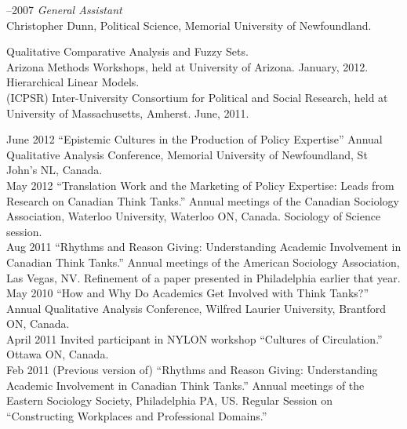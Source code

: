 \documentclass[11pt,usenames,dvipsnames]{article}
\begin{document}
–2007 {\it General Assistant}\\
Christopher Dunn, Political Science, Memorial University of Newfoundland.\\



\noindent Qualitative Comparative Analysis and Fuzzy Sets.\\ 
Arizona Methods Workshops, held at University of Arizona. January, 2012.\\

\noindent Hierarchical Linear Models.\\ 
(ICPSR) Inter-University Consortium for Political and Social Research, held at University of Massachusetts, Amherst. June, 2011.\\



\ind June 2012 ``Epistemic Cultures in the Production of Policy Expertise'' Annual Qualitative Analysis Conference, Memorial University of Newfoundland, St John's NL, Canada.\\

\ind May 2012 ``Translation Work and the Marketing of Policy Expertise: Leads from Research on Canadian Think Tanks.'' Annual meetings of the Canadian Sociology Association, Waterloo University, Waterloo ON, Canada. Sociology of Science session.\\

\ind Aug 2011 ``Rhythms and Reason Giving: Understanding Academic Involvement in Canadian Think Tanks.'' Annual meetings of the American Sociology Association, Las Vegas, NV. Refinement of a paper presented in Philadelphia earlier that year. \\

\ind May 2010 ``How and Why Do Academics Get Involved with Think Tanks?'' Annual Qualitative Analysis Conference, Wilfred Laurier University, Brantford ON, Canada.\\

\ind April 2011 Invited participant in NYLON workshop ``Cultures of Circulation.'' Ottawa ON, Canada.\\

\ind Feb 2011 (Previous version of) ``Rhythms and Reason Giving: Understanding Academic Involvement in Canadian Think Tanks.'' Annual meetings of the Eastern Sociology Society, Philadelphia PA, US. Regular Session on ``Constructing Workplaces and Professional Domains.''\\
\end{document}
